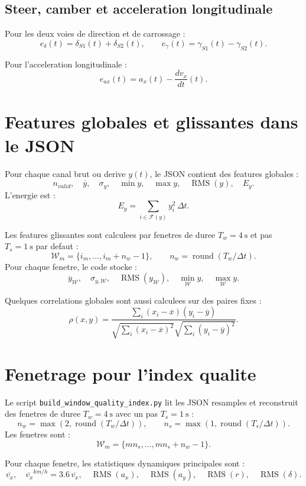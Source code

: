 \documentclass[11pt,a4paper]{article}
\newcommand{\RMS}{\operatorname{RMS}}
\newcommand{\finite}{\mathcal{F}}
\begin{document}
\subsection{Steer, camber et acceleration longitudinale}

Pour les deux voies de direction et de carrossage :
\[
  e_{\delta}(t)=\delta_{S1}(t)+\delta_{S2}(t),
  \qquad
  e_{\gamma}(t)=\gamma_{S1}(t)-\gamma_{S2}(t).
\]

Pour l'acceleration longitudinale :
\[
  e_{ax}(t)=a_x(t)-\frac{d v_x}{dt}(t).
\]

\section{Features globales et glissantes dans le JSON}

Pour chaque canal brut ou derive $y(t)$, le JSON contient des features globales :
\[
  n_{valid},\quad \overline{y},\quad \sigma_y,\quad \min y,\quad \max y,\quad \RMS(y),\quad E_y.
\]
L'energie est :
\[
  E_y=\sum_{i\in\finite(y)} y_i^2\,\Delta t.
\]

Les features glissantes sont calculees par fenetres de duree $T_w=4~\mathrm{s}$ et pas $T_s=1~\mathrm{s}$ par defaut :
\[
  \mathcal{W}_m=\{i_m,\ldots,i_m+n_w-1\},\qquad
  n_w=\operatorname{round}(T_w/\Delta t).
\]
Pour chaque fenetre, le code stocke :
\[
  \overline{y}_{\mathcal{W}},\quad
  \sigma_{y,\mathcal{W}},\quad
  \RMS(y_{\mathcal{W}}),\quad
  \min_{\mathcal{W}}y,\quad
  \max_{\mathcal{W}}y.
\]

Quelques correlations globales sont aussi calculees sur des paires fixes :
\[
  \rho(x,y)=
  \frac{\sum_i (x_i-\overline{x})(y_i-\overline{y})}
       {\sqrt{\sum_i(x_i-\overline{x})^2}\sqrt{\sum_i(y_i-\overline{y})^2}}.
\]

\section{Fenetrage pour l'index qualite}

Le script \texttt{build\_window\_quality\_index.py} lit les JSON resamples et reconstruit des fenetres de duree $T_w=4~\mathrm{s}$ avec un pas $T_s=1~\mathrm{s}$ :
\[
  n_w=\max(2,\operatorname{round}(T_w/\Delta t)),\qquad
  n_s=\max(1,\operatorname{round}(T_s/\Delta t)).
\]
Les fenetres sont :
\[
  \mathcal{W}_m = \{m n_s,\ldots,m n_s+n_w-1\}.
\]

Pour chaque fenetre, les statistiques dynamiques principales sont :
\[
  \overline{v_x},\quad
  \overline{v_x}^{km/h}=3.6\,\overline{v_x},\quad
  \RMS(a_x),\quad
  \RMS(a_y),\quad
  \RMS(r),\quad
  \RMS(\delta).
\]
\end{document}
